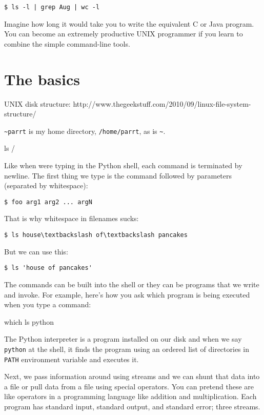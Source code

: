 \begin{fullwidth}
\begin{lstlisting}[style=BashInputStyle]
$ ls -l | grep Aug | wc -l
\end{lstlisting}

Imagine how long it would take you to write the equivalent C or Java program. You can become an extremely productive UNIX programmer if you learn to combine the simple command-line tools.

\section{The basics}

UNIX disk structure: http://www.thegeekstuff.com/2010/09/linux-file-system-structure/

{\tt \verb|~|parrt} is my home directory, {\tt /home/parrt}, as is {\tt \verb|~|}.

{\small
\bash[script,stdout, prefix=$]
ls /
\END
}

Like when were typing in the Python shell, each command is terminated by newline. The first thing we type is the command followed by parameters (separated by whitespace):

\begin{lstlisting}[style=BashInputStyle]
$ foo arg1 arg2 ... argN
\end{lstlisting}

That is why whitespace in filenames sucks:

\begin{lstlisting}[style=BashInputStyle]
$ ls house\textbackslash of\textbackslash pancakes
\end{lstlisting}

\noindent But we can use this:

\begin{lstlisting}[style=BashInputStyle]
$ ls 'house of pancakes'
\end{lstlisting}

The commands can be built into the shell or they can be programs that we write and invoke.  For example, here's how you ask which program is being executed when you type a command:

{\small
\bash[script,stdout,prefix=$]
which ls python
\END
}

The Python interpreter is a program installed on our disk and when we say {\tt python} at the shell, it finds the program using an ordered list of directories in {\tt PATH} environment variable and executes it.

Next, we pass information around using streams and we can shunt that data into a file or pull data from a file using special operators. You can pretend these are like operators in a programming language like addition and multiplication. Each program has standard input, standard output, and standard error; three streams. 


\end{fullwidth}
